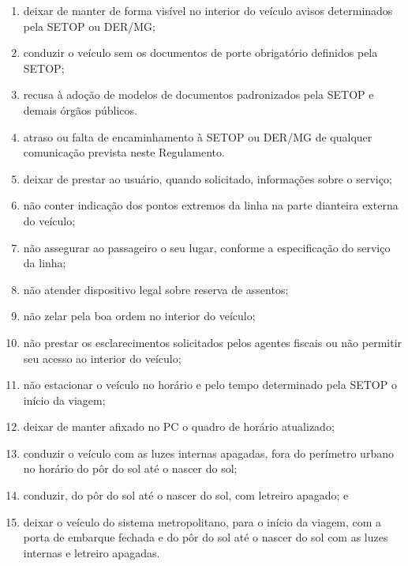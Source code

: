 \begin{enumerate}[resume, label=Art. \arabic*]
\begin{enumerate}[label=\roman*.]
\item deixar de manter de forma visível no interior do veículo avisos determinados pela SETOP ou DER/MG;

\item conduzir o veículo sem os documentos de porte obrigatório definidos pela SETOP;

\item recusa à adoção de modelos de documentos padronizados pela SETOP e demais órgãos públicos.

\item atraso ou falta de encaminhamento à SETOP ou DER/MG de qualquer comunicação prevista neste Regulamento.

\item deixar de prestar ao usuário, quando solicitado, informações sobre o serviço;

\item não conter indicação dos pontos extremos da linha na parte dianteira externa do veículo;

\item não assegurar ao passageiro o seu lugar, conforme a especificação do serviço da linha;

\item não atender dispositivo legal sobre reserva de assentos;

\item não zelar pela boa ordem no interior do veículo;

\item não prestar os esclarecimentos solicitados pelos agentes fiscais ou não permitir seu acesso ao interior do veículo;

\item não estacionar o veículo no horário e pelo tempo determinado pela SETOP o início da viagem;

\item deixar de manter afixado no PC o quadro de horário atualizado;

\item conduzir o veículo com as luzes internas apagadas, fora do perímetro urbano no horário do pôr do sol até o nascer do sol;

\item conduzir, do pôr do sol até o nascer do sol, com letreiro apagado; e

\item deixar o veículo do sistema metropolitano, para o início da viagem, com a porta de embarque fechada e do pôr do sol até o nascer do sol com as luzes internas e letreiro apagadas.
\end{enumerate}


\end{enumerate}
